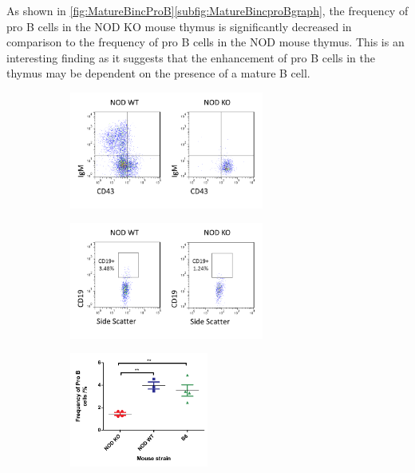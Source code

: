 As shown in \cref{fig:MatureBincProB}\ref{subfig:MatureBincproBgraph}, the frequency of pro B cells in the NOD KO mouse thymus is significantly decreased in comparison to the frequency of pro B cells in the NOD mouse thymus.
This is an interesting finding as it suggests that the enhancement of pro B cells in the thymus may be dependent on the presence of a mature B cell.


\begin{figure}
	\begin{subfigure}{\textwidth}
	\caption{}
	\includegraphics[width=0.7\textwidth]{Figures/NODvKOBM.png}
	\label{subfig:KOBM}
	\end{subfigure}
	\begin{subfigure}{\textwidth}
	\caption{}
	\includegraphics[width=0.7\textwidth]{Figures/NODvKOproBcells.png}
	\label{subfig:ThyProBcells}
	\end{subfigure}
	\begin{subfigure}{\textwidth}
	\caption{}
	\includegraphics[width=0.5\textwidth]{Figures/MatureBincproBgraph.pdf}

\end{subfigure}
\end{figure}
